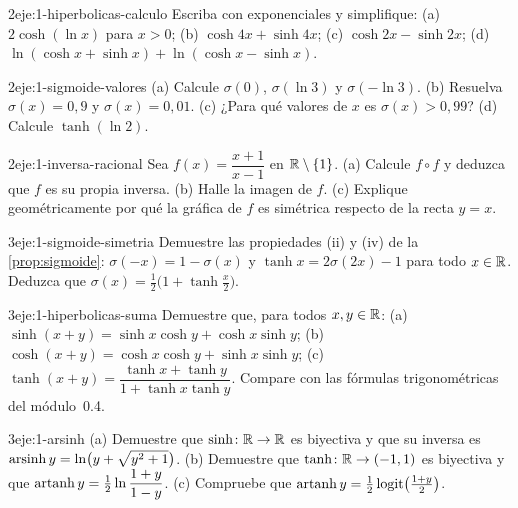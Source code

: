 \begin{ejercicio}{2}{eje:1-hiperbolicas-calculo}
Escriba con exponenciales y simplifique: (a) $2\cosh(\ln x)$ para $x>0$; (b) $\cosh 4x+\sinh 4x$; (c) $\cosh 2x-\sinh 2x$; (d) $\ln(\cosh x+\sinh x)+\ln(\cosh x-\sinh x)$.
\end{ejercicio}

\begin{ejercicio}{2}{eje:1-sigmoide-valores}
(a) Calcule $\sigma(0)$, $\sigma(\ln 3)$ y $\sigma(-\ln 3)$. (b) Resuelva $\sigma(x)=0{,}9$ y $\sigma(x)=0{,}01$. (c) ¿Para qué valores de $x$ es $\sigma(x)>0{,}99$? (d) Calcule $\tanh(\ln 2)$.
\end{ejercicio}

\begin{ejercicio}{2}{eje:1-inversa-racional}
Sea $f(x)=\dfrac{x+1}{x-1}$ en $\mathbb{R}\setminus\{1\}$. (a) Calcule $f\circ f$ y deduzca que $f$ es su propia inversa. (b) Halle la imagen de $f$. (c) Explique geométricamente por qué la gráfica de $f$ es simétrica respecto de la recta $y=x$.
\end{ejercicio}

\begin{ejercicio}{3}{eje:1-sigmoide-simetria}
Demuestre las propiedades (ii) y (iv) de la \cref{prop:sigmoide}: $\sigma(-x)=1-\sigma(x)$ y $\tanh x=2\sigma(2x)-1$ para todo $x\in\mathbb{R}$. Deduzca que $\sigma(x)=\tfrac12\bigl(1+\tanh\tfrac{x}{2}\bigr)$.
\end{ejercicio}

\begin{ejercicio}{3}{eje:1-hiperbolicas-suma}
Demuestre que, para todos $x,y\in\mathbb{R}$:
(a) $\sinh(x+y)=\sinh x\cosh y+\cosh x\sinh y$;
(b) $\cosh(x+y)=\cosh x\cosh y+\sinh x\sinh y$;
(c) $\tanh(x+y)=\dfrac{\tanh x+\tanh y}{1+\tanh x\tanh y}$.
Compare con las fórmulas trigonométricas del módulo~0.4.
\end{ejercicio}

\begin{ejercicio}{3}{eje:1-arsinh}
(a) Demuestre que $\sinh\colon\mathbb{R}\to\mathbb{R}$ es biyectiva y que su inversa es $\operatorname{arsinh} y=\ln\bigl(y+\sqrt{y^{2}+1}\bigr)$. (b) Demuestre que $\tanh\colon\mathbb{R}\to(-1,1)$ es biyectiva y que $\operatorname{artanh} y=\tfrac12\ln\dfrac{1+y}{1-y}$. (c) Compruebe que $\operatorname{artanh} y=\tfrac12\operatorname{logit}\bigl(\tfrac{1+y}{2}\bigr)$.
\end{ejercicio}

